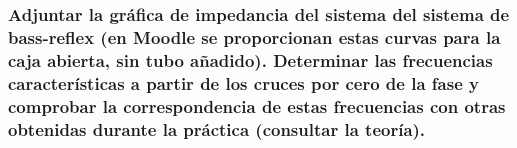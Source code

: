 \documentclass[10pt]{article}
\begin{document}
\subsubsection{Adjuntar la gráfica de impedancia del sistema del sistema de bass-reflex (en Moodle se proporcionan estas curvas para la caja abierta, sin tubo añadido). Determinar las frecuencias características a partir de los cruces por cero de la fase y comprobar la correspondencia de estas frecuencias con otras obtenidas durante la práctica (consultar la teoría).}
\end{document}
